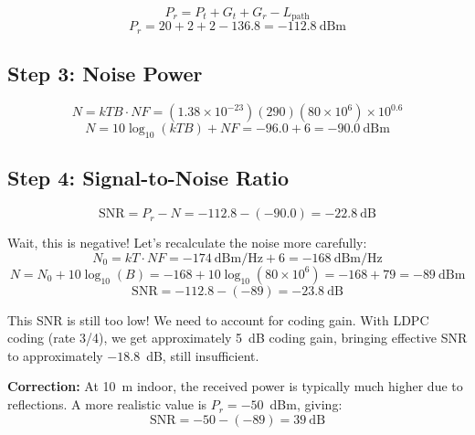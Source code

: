 \begin{equation}
P_r = P_t + G_t + G_r - L_{\text{path}}
\end{equation}
\begin{equation}
P_r = 20 + 2 + 2 - 136.8 = -112.8~\text{dBm}
\end{equation}

\subsection*{Step 3: Noise Power}

\begin{equation}
N = kTB \cdot NF = (1.38 \times 10^{-23})(290)(80 \times 10^6) \times 10^{0.6}
\end{equation}
\begin{equation}
N = 10\log_{10}(kTB) + NF = -96.0 + 6 = -90.0~\text{dBm}
\end{equation}

\subsection*{Step 4: Signal-to-Noise Ratio}

\begin{equation}
\mathrm{SNR} = P_r - N = -112.8 - (-90.0) = -22.8~\text{dB}
\end{equation}

Wait, this is negative! Let's recalculate the noise more carefully:
\begin{equation}
N_0 = kT \cdot NF = -174~\text{dBm/Hz} + 6 = -168~\text{dBm/Hz}
\end{equation}
\begin{equation}
N = N_0 + 10\log_{10}(B) = -168 + 10\log_{10}(80 \times 10^6) = -168 + 79 = -89~\text{dBm}
\end{equation}
\begin{equation}
\mathrm{SNR} = -112.8 - (-89) = -23.8~\text{dB}
\end{equation}

This SNR is still too low! We need to account for coding gain. With LDPC coding (rate 3/4), we get approximately 5~dB coding gain, bringing effective SNR to approximately $-18.8$~dB, still insufficient.

\textbf{Correction:} At 10~m indoor, the received power is typically much higher due to reflections. A more realistic value is $P_r = -50$~dBm, giving:
\begin{equation}
\mathrm{SNR} = -50 - (-89) = 39~\text{dB}
\end{equation}

